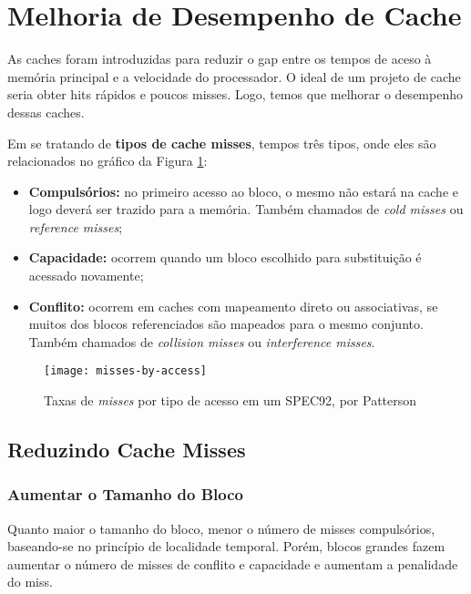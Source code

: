 \section{Melhoria de Desempenho de Cache}
As caches foram introduzidas para reduzir o gap entre os tempos de aceso à memória principal e a velocidade do processador. O ideal de um projeto de cache seria obter hits rápidos e poucos misses. Logo, temos que melhorar o desempenho dessas caches.

Em se tratando de \textbf{tipos de cache misses}, tempos três tipos, onde eles são relacionados no gráfico da Figura \ref{fig:misses-by-access}:

\begin{itemize}
  \item \textbf{Compulsórios:} no primeiro acesso ao bloco, o mesmo não estará na cache e logo deverá ser trazido para a memória. Também chamados de \textit{cold misses} ou \textit{reference misses};

  \item \textbf{Capacidade:} ocorrem quando um bloco escolhido para substituição é acessado novamente;

  \item \textbf{Conflito:} ocorrem em caches com mapeamento direto ou associativas, se muitos dos blocos referenciados são mapeados para o mesmo conjunto. Também chamados de \textit{collision misses} ou \textit{interference misses}.
\end{itemize}

\begin{figure}[ht]
  \centering
  \texttt{[image: misses-by-access]}
  \caption{Taxas de \textit{misses} por tipo de acesso em um SPEC92, por Patterson}
  \label{fig:misses-by-access}
\end{figure}

\subsection{Reduzindo Cache Misses}

\subsubsection{Aumentar o Tamanho do Bloco}
Quanto maior o tamanho do bloco, menor o número de misses compulsórios, baseando-se no princípio de localidade temporal. Porém, blocos grandes fazem aumentar o número de misses de conflito e capacidade e aumentam a penalidade do miss.

